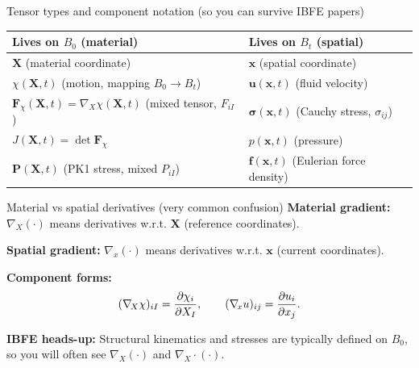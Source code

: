 \documentclass[aspectratio=169]{beamer}
\newcommand{\x}{\bm{x}}
\newcommand{\X}{\bm{X}}
\newcommand{\uEuler}{\bm{u}}
\newcommand{\gradx}{\nabla_{\!x}}
\newcommand{\gradX}{\nabla_{\!X}}
\newcommand{\sigmaC}{\bm{\sigma}} %
\newcommand{\Fdef}{\bm{F}_{\chi}}  %
\newcommand{\Pten}{\bm{P}}         %
\newcommand{\fEuler}{\bm{f}}       %
\begin{document}
\begin{frame}{Tensor types and component notation (so you can survive IBFE papers)}
\small
\medskip
\begin{center}
\renewcommand{\arraystretch}{1.15}
\setlength{\tabcolsep}{6pt}
\begin{tabular}{p{} p{}}
\hline
\textbf{Lives on \(B_0\) (material)} & \textbf{Lives on \(B_t\) (spatial)} \\
\hline
\(\X\) (material coordinate) & \(\x\) (spatial coordinate) \\
\(\chi(\X,t)\) (motion, mapping \(B_0\to B_t\)) & \(\uEuler(\x,t)\) (fluid velocity) \\
\(\Fdef(\X,t)=\gradX\chi(\X,t)\) (mixed tensor, \(F_{iI}\)) & \(\sigmaC(\x,t)\) (Cauchy stress, \(\sigma_{ij}\)) \\
\(J(\X,t)=\det \Fdef\) & \(p(\x,t)\) (pressure) \\
\(\Pten(\X,t)\) (PK1 stress, mixed \(P_{iI}\)) & \(\fEuler(\x,t)\) (Eulerian force density) \\
\hline
\end{tabular}
\end{center}

\end{frame}


\begin{frame}{Material vs spatial derivatives (very common confusion)}
\small
\textbf{Material gradient:} \(\gradX(\cdot)\) means derivatives w.r.t. \(\X\) (reference coordinates).

\medskip
\textbf{Spatial gradient:} \(\gradx(\cdot)\) means derivatives w.r.t. \(\x\) (current coordinates).

\medskip
\textbf{Component forms:}
\[
(\gradX \chi)_{iI} = \pdv{\chi_i}{X_I}, \qquad (\gradx u)_{ij} = \pdv{u_i}{x_j}.
\]

\medskip
\textbf{IBFE heads-up:} Structural kinematics and stresses are typically defined on \(B_0\), so you will often see \(\gradX(\cdot)\) and \(\gradX \cdot (\cdot)\).

\end{frame}
\end{document}
